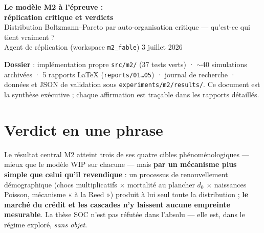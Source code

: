 \documentclass[10pt,a4paper]{article}
\newcommand{\code}[1]{\texttt{#1}}
\begin{document}
\begin{tcolorbox}[enhanced, colback=accent, colframe=accent, arc=6pt,
  left=14pt, right=14pt, top=12pt, bottom=12pt]
\color{white}
{\LARGE\bfseries Le modèle M2 à l'épreuve :\\[2pt]
réplication critique et verdicts}\\[8pt]
{\large Distribution Boltzmann--Pareto par auto-organisation critique —
qu'est-ce qui tient vraiment ?}\\[10pt]
\small Agent de réplication (workspace \code{m2\_fable}) \hfill 3 juillet 2026
\end{tcolorbox}

\vspace{6pt}
\noindent
\begin{tcolorbox}[colback=grisdoux, colframe=grisdoux, arc=3pt]
\small\textbf{Dossier} : implémentation propre \code{src/m2/} (37 tests
verts) · $\sim$40 simulations archivées · 5 rapports LaTeX
(\code{reports/01\ldots05}) · journal de recherche · données et JSON de
validation sous \code{experiments/m2/results/}. Ce document est la synthèse
exécutive ; chaque affirmation est traçable dans les rapports détaillés.
\end{tcolorbox}

\section*{Verdict en une phrase}
\begin{encadre}{Le résultat central}
M2 atteint trois de ses quatre cibles phénoménologiques — mieux que le
modèle WIP sur chacune — mais \textbf{par un mécanisme plus simple que celui
qu'il revendique} : un processus de renouvellement démographique (chocs
multiplicatifs $\times$ mortalité au plancher $d_0$ $\times$ naissances
Poisson, mécanisme « à la Reed ») produit à lui seul toute la distribution ;
\textbf{le marché du crédit et les cascades n'y laissent aucune empreinte
mesurable}. La thèse SOC n'est pas réfutée dans l'absolu — elle est, dans le
régime exploré, \emph{sans objet}.
\end{encadre}

\newpage
\end{document}
